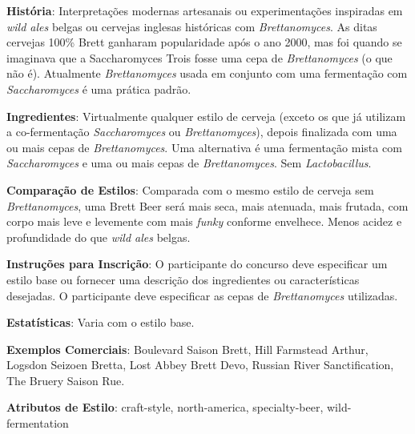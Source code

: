 \textbf{História}: Interpretações modernas artesanais ou experimentações inspiradas em \textit{wild ales} belgas ou cervejas inglesas históricas com \textit{Brettanomyces}. As ditas cervejas 100\% Brett ganharam popularidade após o ano 2000, mas foi quando se imaginava que a Saccharomyces Trois fosse uma cepa de \textit{Brettanomyces} (o que não é). Atualmente \textit{Brettanomyces} usada em conjunto com uma fermentação com \textit{Saccharomyces} é uma prática padrão.

\textbf{Ingredientes}: Virtualmente qualquer estilo de cerveja (exceto os que já utilizam a co-fermentação \textit{Saccharomyces} ou \textit{Brettanomyces}), depois finalizada com uma ou mais cepas de \textit{Brettanomyces}. Uma alternativa é uma fermentação mista com \textit{Saccharomyces} e uma ou mais cepas de \textit{Brettanomyces}. Sem \textit{Lactobacillus}.

\textbf{Comparação de Estilos}: Comparada com o mesmo estilo de cerveja sem \textit{Brettanomyces}, uma Brett Beer será mais seca, mais atenuada, mais frutada, com corpo mais leve e levemente com mais \textit{funky} conforme envelhece. Menos acidez e profundidade do que \textit{wild ales} belgas.

\textbf{Instruções para Inscrição}: O participante do concurso deve especificar um estilo base ou fornecer uma descrição dos ingredientes ou características desejadas. O participante deve especificar as cepas de \textit{Brettanomyces} utilizadas.

\textbf{Estatísticas}: Varia com o estilo base.

\textbf{Exemplos Comerciais}: Boulevard Saison Brett, Hill Farmstead Arthur, Logsdon Seizoen Bretta, Lost Abbey Brett Devo, Russian River Sanctification, The Bruery Saison Rue.

\textbf{Atributos de Estilo}: craft-style, north-america, specialty-beer, wild-fermentation
